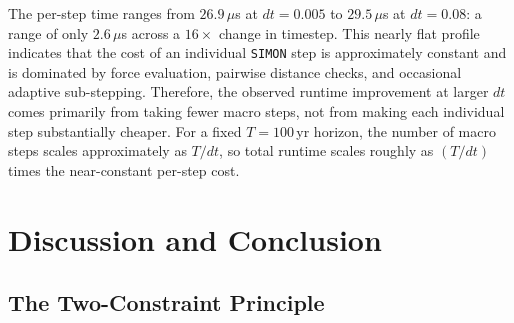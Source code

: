 \documentclass[12pt]{article}
\begin{document}
\begin{table}[H]
\centering
\caption{Speed--accuracy frontier results for \texttt{SIMON} over $T=100$\,yr. The bold row marks the operational timestep.}
\label{tab:frontier}
\end{table}

The per-step time ranges from $26.9\,\mu$s at $dt = 0.005$ to $29.5\,\mu$s at
$dt = 0.08$: a range of only $2.6\,\mu$s across a $16\times$ change in timestep.
This nearly flat profile indicates that the cost of an individual \texttt{SIMON}
step is approximately constant and is dominated by force evaluation, pairwise
distance checks, and occasional adaptive sub-stepping. Therefore, the observed
runtime improvement at larger $dt$ comes primarily from taking fewer macro steps,
not from making each individual step substantially cheaper. For a fixed
$T = 100$\,yr horizon, the number of macro steps scales approximately as $T/dt$,
so total runtime scales roughly as $(T/dt)$ times the near-constant per-step cost.


\section{Discussion and Conclusion}
\label{sec:discussion}

\subsection{The Two-Constraint Principle}
\end{document}
